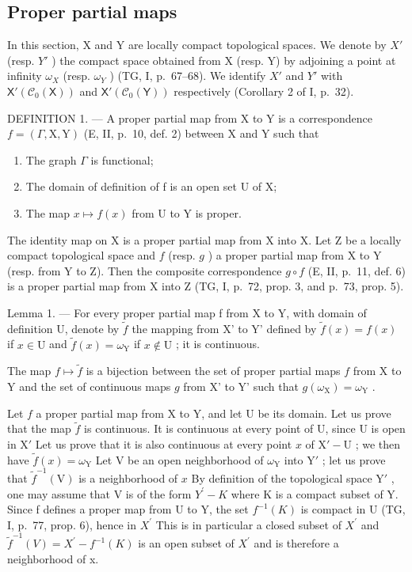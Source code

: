 \subsection{Proper partial maps}

In this section, X and Y are locally compact topological spaces. We denote by \(X'\) (resp. \(Y'\) ) the compact space obtained from X (resp. Y) by adjoining a point at infinity \(\omega_{X}\) (resp. \(\omega_{Y}\) ) (TG, I, p.~67--68). We identify \(X'\) and \(Y'\) with \(\mathsf{X}'(\mathcal{C}_{0}(\mathsf{X}))\) and \(\mathsf{X}'(\mathcal{C}_{0}(\mathsf{Y}))\) respectively (Corollary 2 of I, p.~32).

DEFINITION 1. --- A proper partial map from X to Y is a correspondence \(f = (\Gamma, \mathrm{X}, \mathrm{Y})\) (E, II, p.~10, def. 2) between X and Y such that

\begin{enumerate}
\def\labelenumi{(\roman{enumi})}
\item
  The graph \(\Gamma\) is functional;
\item
  The domain of definition of f is an open set U of X;
\item
  The map \(x\mapsto f(x)\) from U to Y is proper.
\end{enumerate}

The identity map on X is a proper partial map from X into X. Let Z be a locally compact topological space and \(f\) (resp. \(g\) ) a proper partial map from X to Y (resp. from Y to Z). Then the composite correspondence \(g \circ f\) (E, II, p.~11, def. 6) is a proper partial map from X into Z (TG, I, p.~72, prop. 3, and p.~73, prop. 5).

Lemma 1. --- For every proper partial map f from X to Y, with domain of definition U, denote by \(\widetilde{f}\) the mapping from X' to Y' defined by \(\widetilde{f}(x) = f(x)\) if \(x \in \mathrm{U}\) and \(\widetilde{f}(x) = \omega_{\mathrm{Y}}\) if \(x \notin \mathrm{U}\) ; it is continuous.

The map \(f \mapsto \widetilde{f}\) is a bijection between the set of proper partial maps \(f\) from X to Y and the set of continuous maps \(g\) from X' to Y' such that \(g(\omega_{\mathrm{X}}) = \omega_{\mathrm{Y}}\) .

Let \(f\) a proper partial map from X to Y, and let U be its domain. Let us prove that the map \(\widetilde{f}\) is continuous. It is continuous at every point of U, since U is open in \(\mathrm{X}'\) Let us prove that it is also continuous at every point \(x\) of \(\mathrm{X}' - \mathrm{U}\) ; we then have \(\widetilde{f}(x) = \omega_{\mathrm{Y}}\) Let V be an open neighborhood of \(\omega_{\mathrm{Y}}\) into \(\mathrm{Y}'\) ; let us prove that \(\widetilde{f}^{-1}(\mathrm{V})\) is a neighborhood of \(x\) By definition of the topological space \(\mathrm{Y}'\) , one may assume that V is of the form \(Y^{\prime}-K\) where K is a compact subset of Y. Since f defines a proper map from U to Y, the set \(f^{-1}(K)\) is compact in U (TG, I, p.~77, prop. 6), hence in \(X^{\prime}\) This is in particular a closed subset of \(X^{\prime}\) and \(\tilde{f}^{-1}(V)=X^{\prime}-f^{-1}(K)\) is an open subset of \(X^{\prime}\) and is therefore a neighborhood of x.


